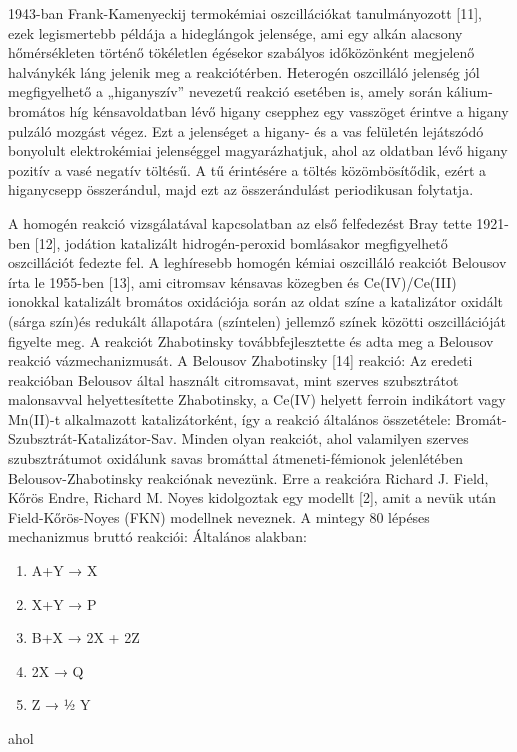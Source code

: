 1943-ban Frank-Kamenyeckij termokémiai oszcillációkat tanulmányozott [11], ezek legismertebb példája a hideglángok jelensége, ami egy alkán alacsony hőmérsékleten történő tökéletlen égésekor szabályos időközönként megjelenő halványkék láng jelenik meg a reakciótérben.
Heterogén oszcilláló jelenség jól megfigyelhető a „higanyszív” nevezetű reakció esetében is, amely során kálium-bromátos híg kénsavoldatban lévő higany csepphez egy vasszöget érintve a higany pulzáló mozgást végez. Ezt a jelenséget a higany- és a vas felületén lejátszódó bonyolult elektrokémiai jelenséggel magyarázhatjuk, ahol az oldatban lévő higany pozitív a vasé negatív töltésű. A tű érintésére a töltés közömbösítődik, ezért a higanycsepp összerándul, majd ezt az összerándulást periodikusan folytatja.

A homogén reakció vizsgálatával kapcsolatban az első felfedezést Bray tette 1921-ben [12], jodátion katalizált hidrogén-peroxid bomlásakor megfigyelhető oszcillációt fedezte fel. A leghíresebb homogén kémiai oszcilláló reakciót Belousov írta le 1955-ben [13], ami citromsav kénsavas közegben és Ce(IV)/Ce(III) ionokkal katalizált bromátos oxidációja során az oldat színe a katalizátor oxidált (sárga szín)és redukált állapotára (színtelen) jellemző színek közötti oszcillációját figyelte meg.
 A reakciót Zhabotinsky továbbfejlesztette és adta meg a Belousov reakció vázmechanizmusát. A Belousov Zhabotinsky [14] reakció:
Az eredeti reakcióban Belousov által használt citromsavat, mint szerves szubsztrátot malonsavval helyettesítette Zhabotinsky, a Ce(IV) helyett ferroin indikátort vagy Mn(II)-t alkalmazott katalizátorként, így a reakció általános összetétele: Bromát-Szubsztrát-Katalizátor-Sav.
Minden olyan reakciót, ahol valamilyen szerves szubsztrátumot oxidálunk savas bromáttal átmeneti-fémionok jelenlétében Belousov-Zhabotinsky reakciónak nevezünk. Erre a reakcióra Richard J. Field, Kőrös Endre, Richard M. Noyes kidolgoztak egy modellt [2], amit a nevük után Field-Kőrös-Noyes (FKN) modellnek neveznek. A mintegy 80 lépéses mechanizmus bruttó reakciói:
Általános alakban:

\begin{enumerate}
\item A+Y → X
\item X+Y → P
\item B+X → 2X + 2Z
\item 2X → Q
\item Z → ½ Y
\end{enumerate}

ahol

